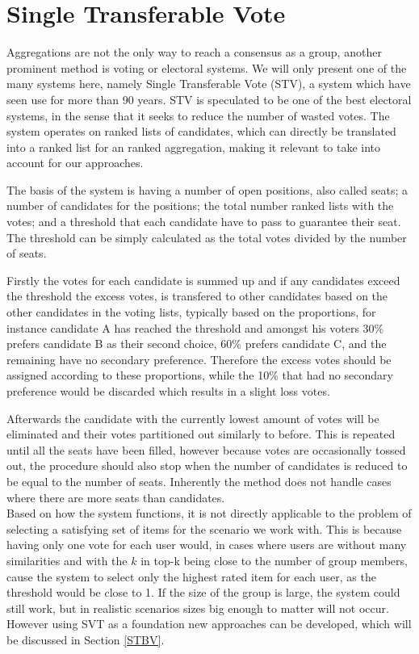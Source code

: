 \section{Single Transferable Vote}
Aggregations are not the only way to reach a consensus as a group, another prominent method is voting or electoral systems. We will only present one of the many systems here, namely Single Transferable Vote (STV), a system which have seen use for more than 90 years. \cite{stvireland}
STV is speculated to be one of the best electoral systems, in the sense that it seeks to reduce the number of wasted votes. The system operates on ranked lists of candidates, which can directly be translated into a ranked list for an ranked aggregation, making it relevant to take into account for our approaches.

The basis of the system is having a number of open positions, also called seats; a number of candidates for the positions; the total number ranked lists with the votes; and a threshold that each candidate have to pass to guarantee their seat. The threshold can be simply calculated as the total votes divided by the number of seats. \cite{stv}

Firstly the votes for each candidate is summed up and if any candidates exceed the threshold the excess votes, is transfered to other candidates based on the other candidates in the voting lists, typically based on the proportions, for instance candidate A has reached the threshold and amongst his voters 30\% prefers candidate B as their second choice, 60\% prefers candidate C, and the remaining have no secondary preference. Therefore the excess votes should be assigned according to these proportions, while the 10\% that had no secondary preference would be discarded which results in a slight loss votes.

Afterwards the candidate with the currently lowest amount of votes will be eliminated and their votes partitioned out similarly to before. This is repeated until all the seats have been filled, however because votes are occasionally tossed out, the procedure should also stop when the number of candidates is reduced to be equal to the number of seats. Inherently the method does not handle cases where there are more seats than candidates.\\

Based on how the system functions, it is not directly applicable to the problem of selecting a satisfying set of items for the scenario we work with. This is because having only one vote for each user would, in cases where users are without many similarities and with the $k$ in top-k being close to the number of group members, cause the system to select only the highest rated item for each user, as the threshold would be close to 1. If the size of the group is large, the system could still work, but in realistic scenarios sizes big enough to matter will not occur. However using SVT as a foundation new approaches can be developed, which will be discussed in Section \ref{STBV}.